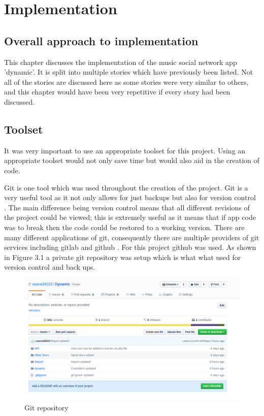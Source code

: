 \chapter{Implementation}
\section{Overall approach to implementation}
This chapter discusses the implementation of the music social network app 'dynamic'. It is split into  multiple stories which have previously been listed. Not all of the stories are discussed here as some stories were very similar to others, and this chapter would have been very repetitive if every story had been discussed.

\section{Toolset}
It was very important to use an appropriate toolset for this project. Using an appropriate toolset would not only save time but would also aid in the creation of code.

Git is one tool which was used throughout the creation of the project. Git is a very useful tool as it not only allows for just backups but also for version control \cite{git}. The main difference being version control means that all different revisions of the project could be viewed; this is extremely useful as it means that if app code was to break then the code could be restored to a working version. There are many different applications of git, consequently there are multiple providers of git services including gitlab and github \cite{github} \cite{gitlab}. For this project github was used. As shown in Figure 3.1 a private git repository was setup which is what what used for version control and back ups.
\begin{center} 
\begin{figure}[H]
\includegraphics[scale=0.3]{images/git}
\caption{Git repository}
\end{figure}
\end{center}

